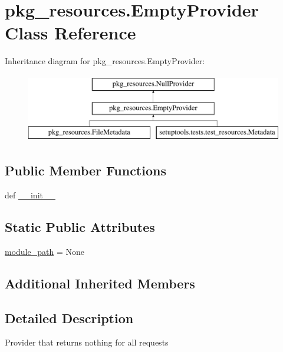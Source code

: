 \hypertarget{classpkg__resources_1_1EmptyProvider}{}\section{pkg\+\_\+resources.\+Empty\+Provider Class Reference}
\label{classpkg__resources_1_1EmptyProvider}
Inheritance diagram for pkg\+\_\+resources.\+Empty\+Provider\+:\begin{figure}[H]
\begin{center}
\leavevmode
\includegraphics[height=3.000000cm]{classpkg__resources_1_1EmptyProvider}
\end{center}
\end{figure}
\subsection*{Public Member Functions}
\begin{DoxyCompactItemize}
\item 
def \hyperlink{classpkg__resources_1_1EmptyProvider_a656010fda9060936204e25c21f8a7ad2}{\+\_\+\+\_\+init\+\_\+\+\_\+}
\end{DoxyCompactItemize}
\subsection*{Static Public Attributes}
\begin{DoxyCompactItemize}
\item 
\hyperlink{classpkg__resources_1_1EmptyProvider_ab8ccb1251fac53b8648ceb34c8449d67}{module\+\_\+path} = None
\end{DoxyCompactItemize}
\subsection*{Additional Inherited Members}


\subsection{Detailed Description}
\begin{DoxyVerb}Provider that returns nothing for all requests\end{DoxyVerb}
 

